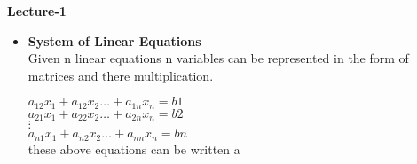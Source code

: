 \documentclass[a4paper,11pt]{article}
\numberwithin{equation}{section}
\begin{document}


    \begin{center}
        \Huge{\textbf{Lecture-1}}
    \end{center}
    \vspace{5pt}
    \begin{itemize}
        \item \textbf{System of Linear Equations}
            \vspace{5pt}\\
            Given n linear equations n variables can be represented in the form of matrices and there multiplication.\\
            \vspace{5pt} 
            \begin{center}
                $a_{12}x_{1}+a_{12}x_2\dots +a_{1n}x_n=b1$\\
                $a_{21}x_{1}+a_{22}x_2\dots +a_{2n}x_n=b2$\\
                $\vdots$\\
                $a_{n1}x_{1}+a_{n2}x_2\dots +a_{nn}x_n=bn$\\

                \vspace{4pt}
                these above equations can be written a


\end{center}
\end{itemize}
\end{document}
